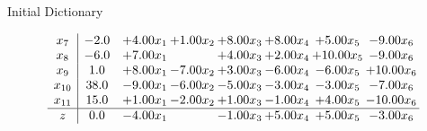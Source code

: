 \documentclass[8pt]{article}
\begin{document}
Initial Dictionary 

\[\begin{array}{c| c c@{\hskip 2pt} c@{\hskip 2pt} c@{\hskip 2pt} c@{\hskip 2pt} c@{\hskip 2pt} c@{\hskip 2pt} }
 x_{7}   &  -2.0 & +  4.00 x_{1} & +  1.00 x_{2} & +  8.00 x_{3} & +  8.00 x_{4} & +  5.00 x_{5} & -9.00 x_{6}\\
 x_{8}   &  -6.0 & +  7.00 x_{1} &   & +  4.00 x_{3} & +  2.00 x_{4} & + 10.00 x_{5} & -9.00 x_{6}\\
 x_{9}   &  1.0 & +  8.00 x_{1} & -7.00 x_{2} & +  3.00 x_{3} & -6.00 x_{4} & -6.00 x_{5} & + 10.00 x_{6}\\
 x_{10}   &  38.0 & -9.00 x_{1} & -6.00 x_{2} & -5.00 x_{3} & -3.00 x_{4} & -3.00 x_{5} & -7.00 x_{6}\\
 x_{11}   &  15.0 & +  1.00 x_{1} & -2.00 x_{2} & +  1.00 x_{3} & -1.00 x_{4} & +  4.00 x_{5} & -10.00 x_{6}\\
\hline
z    &  0.0 & -4.00 x_{1} &   & -1.00 x_{3} & +  5.00 x_{4} & +  5.00 x_{5} & -3.00 x_{6}\\
\end{array}\]
\end{document}
